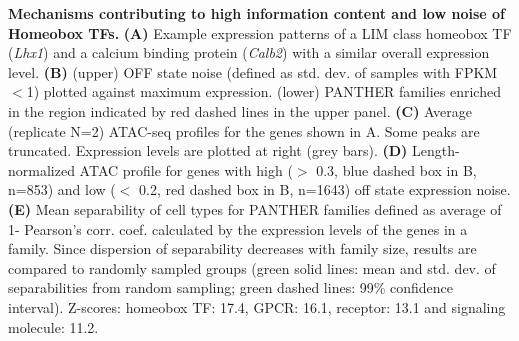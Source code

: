 \textbf{Mechanisms contributing to high information content and low noise of Homeobox TFs.}
\textbf{(A)} Example expression patterns of a LIM class homeobox TF (\textit{Lhx1}) and a calcium binding protein (\textit{Calb2}) with a similar overall expression level. 
\textbf{(B)} (upper) OFF state noise (defined as std. dev. of samples with FPKM$<$1) plotted against maximum expression. (lower) PANTHER families enriched in the region indicated by red dashed lines in the upper panel.
\textbf{(C)} Average (replicate N=2) ATAC-seq profiles for the genes shown in A. Some peaks are truncated. Expression levels are plotted at right (grey bars).
\textbf{(D)} Length-normalized ATAC profile for genes with high ($>$ 0.3, blue dashed box in B, n=853) and low ($<$ 0.2, red dashed box in B, n=1643) off state expression noise.
\textbf{(E)} Mean separability of cell types for PANTHER families defined as average of 1- Pearson's corr. coef. calculated by the expression levels of the genes in a family. Since dispersion of separability decreases with family size, results are compared to randomly sampled groups (green solid lines: mean and std. dev. of separabilities from random sampling; green dashed lines: 99\% confidence interval). Z-scores: homeobox TF: 17.4, GPCR: 16.1, receptor: 13.1 and signaling molecule: 11.2. 
